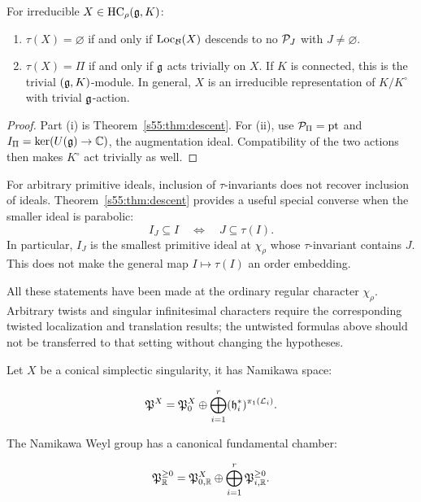 \begin{prop}
For irreducible $X\in\operatorname{HC}_\rho(\mathfrak{g},K)$:
\begin{enumerate}
\renewcommand{\labelenumi}{\textup{(\roman{enumi})}}
 \item $\tau(X)=\varnothing$ if and only if
       $\operatorname{Loc}_{\mathcal{B}}(X)$ descends to no $\mathcal{P}_J$ with
       $J\ne\varnothing$.
 \item $\tau(X)=\Pi$ if and only if $\mathfrak{g}$ acts trivially on $X$.
       If $K$ is connected, this is the trivial $(\mathfrak{g},K)$-module.
       In general, $X$ is an irreducible representation of $K/K^\circ$
       with trivial $\mathfrak{g}$-action.
\end{enumerate}
\end{prop}

\begin{proof}
Part (i) is Theorem~\ref{s55:thm:descent}. For (ii), use
$\mathcal{P}_\Pi=\mathrm{pt}$ and $I_\Pi=\ker(U(\mathfrak{g})\to\mathbb C)$, the
augmentation ideal. Compatibility of the two actions then makes
$K^\circ$ act trivially as well.
\end{proof}

For arbitrary primitive ideals, inclusion of $\tau$-invariants does not
recover inclusion of ideals. Theorem~\ref{s55:thm:descent} provides a useful
special converse when the smaller ideal is parabolic:
\[
  \boxed{I_J\subseteq I\quad\Longleftrightarrow\quad J\subseteq\tau(I).}
\]
In particular, $I_J$ is the smallest primitive ideal at $\chi_\rho$ whose
$\tau$-invariant contains $J$. This does not make the general map
$I\mapsto\tau(I)$ an order embedding.

All these statements have been made at the ordinary regular character
$\chi_\rho$. Arbitrary twists and singular infinitesimal characters
require the corresponding twisted localization and translation results;
the untwisted formulas above should not be transferred to that setting
without changing the hypotheses.



Let $X$ be a conical simplectic singularity, it has Namikawa space:

\[
  \mathfrak{P}^X = \mathfrak{P}^X_0 \oplus \bigoplus_{i=1}^r (\mathfrak{h}_i^*)^{\pi_1(\mathcal{L}_i)}. 
\]

The Namikawa Weyl group has a canonical fundamental chamber:

\[
  \mathfrak{P}_{\mathbb{R}}^{\geq 0} = \mathfrak{P}^X_{0,\mathbb{R}} \oplus \bigoplus_{i = 1}^r \mathfrak{P}_{i,\mathbb{R}}^{\geq 0}.
\]

